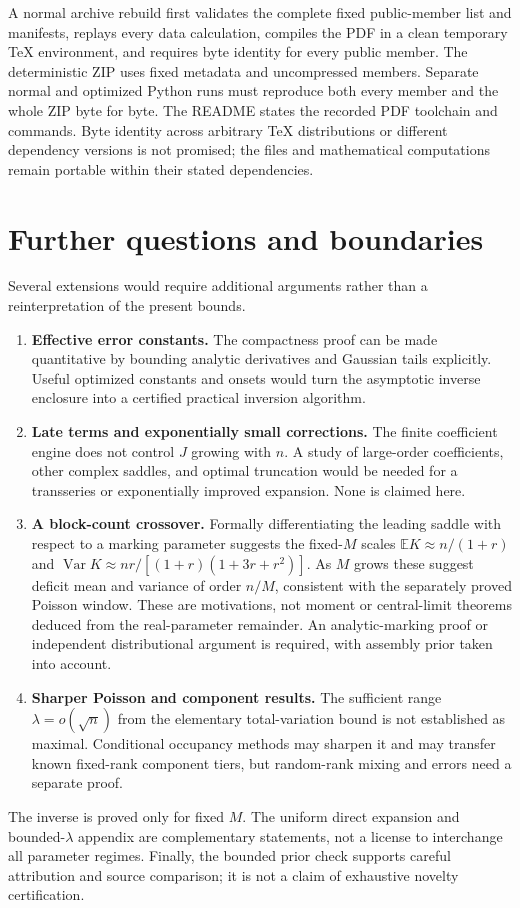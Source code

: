 \documentclass[11pt,letterpaper]{article}
\numberwithin{equation}{section}
\theoremstyle{remark}\newtheorem{remark}[theorem]{Remark}
\newcommand{\E}{\mathbb E}\newcommand{\Prob}{\mathbb P}\newcommand{\ee}{\mathrm e}
\begin{document}
A normal archive rebuild first validates the complete fixed public-member list and manifests, replays every data calculation, compiles the PDF in a clean temporary TeX environment, and requires byte identity for every public member. The deterministic ZIP uses fixed metadata and uncompressed members. Separate normal and optimized Python runs must reproduce both every member and the whole ZIP byte for byte. The README states the recorded PDF toolchain and commands. Byte identity across arbitrary TeX distributions or different dependency versions is not promised; the files and mathematical computations remain portable within their stated dependencies.

\section{Further questions and boundaries}\label{fat:sec:future}
Several extensions would require additional arguments rather than a reinterpretation of the present bounds.
\begin{enumerate}[leftmargin=*]
\item \textbf{Effective error constants.} The compactness proof can be made quantitative by bounding analytic derivatives and Gaussian tails explicitly. Useful optimized constants and onsets would turn the asymptotic inverse enclosure into a certified practical inversion algorithm.
\item \textbf{Late terms and exponentially small corrections.} The finite coefficient engine does not control $J$ growing with $n$. A study of large-order coefficients, other complex saddles, and optimal truncation would be needed for a transseries or exponentially improved expansion. None is claimed here.
\item \textbf{A block-count crossover.} Formally differentiating the leading saddle with respect to a marking parameter suggests the fixed-$M$ scales $\E K\approx n/(1+r)$ and $\operatorname{Var}K\approx nr/[(1+r)(1+3r+r^2)]$. As $M$ grows these suggest deficit mean and variance of order $n/M$, consistent with the separately proved Poisson window. These are motivations, not moment or central-limit theorems deduced from the real-parameter remainder. An analytic-marking proof or independent distributional argument is required, with assembly prior taken into account.
\item \textbf{Sharper Poisson and component results.} The sufficient range $\lambda=o(\sqrt n)$ from the elementary total-variation bound is not established as maximal. Conditional occupancy methods may sharpen it and may transfer known fixed-rank component tiers, but random-rank mixing and errors need a separate proof.
\end{enumerate}
The inverse is proved only for fixed $M$. The uniform direct expansion and bounded-$\lambda$ appendix are complementary statements, not a license to interchange all parameter regimes. Finally, the bounded prior check supports careful attribution and source comparison; it is not a claim of exhaustive novelty certification.
\end{document}
